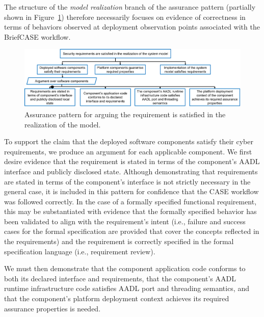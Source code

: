 The structure of the \textit{model realization} branch of the assurance pattern (partially shown in Figure~\ref{fig:req-satisfied-in-model-realization}) therefore necessarily focuses on evidence of correctness in terms of behaviors observed at deployment observation points associated with the BriefCASE workflow.  


\begin{figure}[h] 
	\centering 
	\includegraphics[width=\textwidth]{figs/req-satisfied-in-model-realization.png}
	\caption{Assurance pattern for arguing the requirement is satisfied in the realization of the model.}
	\label{fig:req-satisfied-in-model-realization} 
\end{figure}

To support the claim that the deployed software components satisfy their cyber requirements, we produce an argument for each applicable component.
We first desire evidence that the requirement is stated in terms of the component's AADL interface and publicly disclosed state. 
Although demonstrating that requirements are stated in terms of the component's interface is not strictly necessary in the general case, it is included in this pattern for confidence that the CASE workflow was followed correctly.  In the case of a formally specified functional requirement, this may be substantiated with evidence that the formally specified behavior has been validated to align with the requirement's intent (i.e., failure and success cases for the formal specification are provided that cover the concepts reflected in the requirements) and the requirement is correctly specified in the formal specification language (i.e., requirement review).

We must then demonstrate that the component application code conforms to both its declared interface and requirements, that the component's AADL runtime infrastructure code satisfies AADL port and threading semantics, and that the component's platform deployment context achieves its required assurance properties is needed.  


